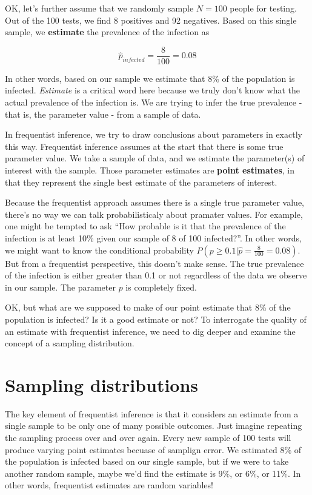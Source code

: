 \documentclass[
]{book}
\begin{document}
OK, let's further assume that we randomly sample \(N = 100\) people for testing. Out of the 100 tests, we find 8 positives and 92 negatives. Based on this single sample, we \textbf{estimate} the prevalence of the infection as

\[
\hat{p}_{infected}=\frac{8}{100}=0.08
\]

In other words, based on our sample we estimate that 8\% of the population is infected. \emph{Estimate} is a critical word here because we truly don't know what the actual prevalence of the infection is. We are trying to infer the true prevalence - that is, the parameter value - from a sample of data.

In frequentist inference, we try to draw conclusions about parameters in exactly this way. Frequentist inference assumes at the start that there is some true parameter value. We take a sample of data, and we estimate the parameter(s) of interest with the sample. Those parameter estimates are \textbf{point estimates}, in that they represent the single best estimate of the parameters of interest.

Because the frequentist approach assumes there is a single true parameter value, there's no way we can talk probabilisticaly about pramater values. For example, one might be tempted to ask ``How probable is it that the prevalence of the infection is at least 10\% given our sample of 8 of 100 infected?''. In other words, we might want to know the conditional probability \(P(p\geq0.1|\hat{p}=\frac{8}{100}=0.08)\). But from a frequentist perspective, this doesn't make sense. The true prevalence of the infection is either greater than 0.1 or not regardless of the data we observe in our sample. The parameter \(p\) is completely fixed.

OK, but what are we supposed to make of our point estimate that 8\% of the population is infected? Is it a good estimate or not? To interrogate the quality of an estimate with frequentist inference, we need to dig deeper and examine the concept of a sampling distribution.

\section{Sampling distributions}\label{sampling-distributions}

The key element of frequentist inference is that it considers an estimate from a single sample to be only one of many possible outcomes. Just imagine repeating the sampling process over and over again. Every new sample of 100 tests will produce varying point estimates becuase of samplign error. We estimated 8\% of the population is infected based on our single sample, but if we were to take another random sample, maybe we'd find the estimate is 9\%, or 6\%, or 11\%. In other words, frequentist estimates are random variables!
\end{document}
